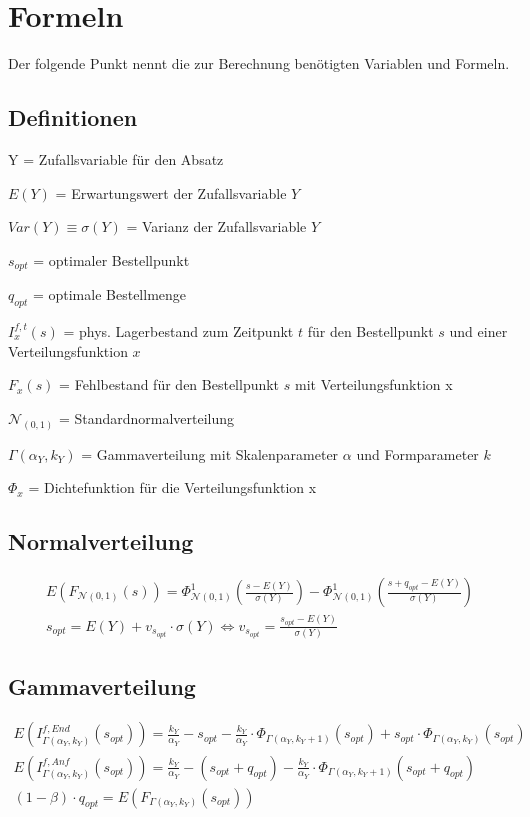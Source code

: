 \section{Formeln}
Der folgende Punkt nennt die zur Berechnung benötigten Variablen und Formeln.
\subsection{Definitionen}
Y = Zufallsvariable für den Absatz

\(E(Y)\) = Erwartungswert der Zufallsvariable $Y$

\(Var(Y) \equiv \sigma(Y)\) = Varianz der Zufallsvariable $Y$

\(s_{opt}\) = optimaler Bestellpunkt

\(q_{opt}\) = optimale Bestellmenge

\(I^{f, t}_{x}(s)\) = phys. Lagerbestand zum Zeitpunkt \(t\) für den Bestellpunkt \(s\) und einer Verteilungsfunktion \(x\) 

\(F_x(s)\) = Fehlbestand für den Bestellpunkt \(s\) mit Verteilungsfunktion x 

\(\mathcal{N}_{(0,1)}\) = Standardnormalverteilung

\(\Gamma(\alpha_Y, k_Y)\) = Gammaverteilung mit Skalenparameter \(\alpha\) und Formparameter \(k\)

\(\Phi_x\) = Dichtefunktion für die Verteilungsfunktion x
\subsection{Normalverteilung}
\begin{gather*}
E\left(F_{\mathcal{N}(0,1)}(s)\right)=\Phi^1_{\mathcal{N}(0,1)}\left(\frac{s-E(Y)}{\sigma(Y)}\right)-\Phi^1_{\mathcal{N}(0,1)}\left(\frac{s+q_{opt}-E(Y)}{\sigma(Y)}\right) \\
s_{opt} = E(Y)+v_{s_{opt}} \cdot \sigma(Y) \Leftrightarrow v_{s_{opt}}=\frac{s_{opt}-E(Y)}{\sigma(Y)}
\end{gather*}
\subsection{Gammaverteilung}
\begin{gather*}
E\left(I^{f,End}_{\Gamma\left(\alpha_{Y},k_Y\right)}\left(s_{opt}\right)\right)=\frac{k_Y}{\alpha_Y}-s_{opt}-\frac{k_Y}{\alpha_Y}\cdot \Phi_{\Gamma\left(\alpha_Y,k_Y+1\right)}\left(s_{opt}\right)+s_{opt}\cdot \Phi_{\Gamma\left(\alpha_Y,k_Y\right)}\left(s_{opt}\right) \\
E\left(I^{f,Anf}_{\Gamma\left(\alpha_{Y},k_Y\right)}\left(s_{opt}\right)\right)=\frac{k_Y}{\alpha_Y}-\left(s_{opt}+q_{opt}\right)-\frac{k_Y}{\alpha_Y}\cdot \Phi_{\Gamma\left(\alpha_Y,k_Y+1\right)}\left(s_{opt}+q_{opt}\right) \\
\left(1-\beta\right)\cdot q_{opt}= E\left(F_{\Gamma\left(\alpha_{Y},k_{Y}\right)}\left(s_{opt}\right)\right)
\end{gather*}